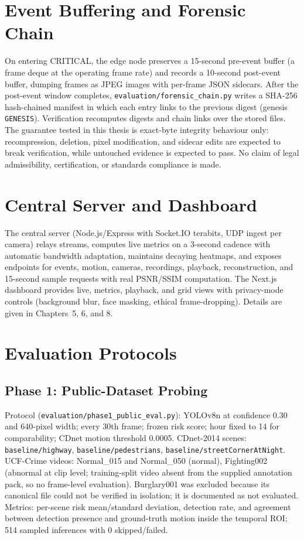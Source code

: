 \section{Event Buffering and Forensic Chain}

On entering CRITICAL, the edge node preserves a 15-second pre-event buffer (a frame deque at the operating frame rate) and records a 10-second post-event buffer, dumping frames as JPEG images with per-frame JSON sidecars. After the post-event window completes, \texttt{evaluation/forensic\_chain.py} writes a SHA-256 hash-chained manifest in which each entry links to the previous digest (genesis \texttt{GENESIS}). Verification recomputes digests and chain links over the stored files. The guarantee tested in this thesis is exact-byte integrity behaviour only: recompression, deletion, pixel modification, and sidecar edits are expected to break verification, while untouched evidence is expected to pass. No claim of legal admissibility, certification, or standards compliance is made.

\section{Central Server and Dashboard}

The central server (Node.js/Express with Socket.IO terabits, UDP ingest per camera) relays streams, computes live metrics on a 3-second cadence with automatic bandwidth adaptation, maintains decaying heatmaps, and exposes endpoints for events, motion, cameras, recordings, playback, reconstruction, and 15-second sample requests with real PSNR/SSIM computation. The Next.js dashboard provides live, metrics, playback, and grid views with privacy-mode controls (background blur, face masking, ethical frame-dropping). Details are given in Chapters~5, 6, and 8.

\section{Evaluation Protocols}

\subsection{Phase 1: Public-Dataset Probing}

Protocol (\texttt{evaluation/phase1\_public\_eval.py}): YOLOv8n at confidence 0.30 and 640-pixel width; every 30th frame; frozen risk score; hour fixed to 14 for comparability; CDnet motion threshold 0.0005. CDnet-2014 scenes: \texttt{baseline/highway}, \texttt{baseline/pedestrians}, \texttt{baseline/streetCornerAtNight}. UCF-Crime videos: Normal\_015 and Normal\_050 (normal), Fighting002 (abnormal at clip level; training-split video absent from the supplied annotation pack, so no frame-level evaluation). Burglary001 was excluded because its canonical file could not be verified in isolation; it is documented as not evaluated. Metrics: per-scene risk mean/standard deviation, detection rate, and agreement between detection presence and ground-truth motion inside the temporal ROI; 514 sampled inferences with 0 skipped/failed.

